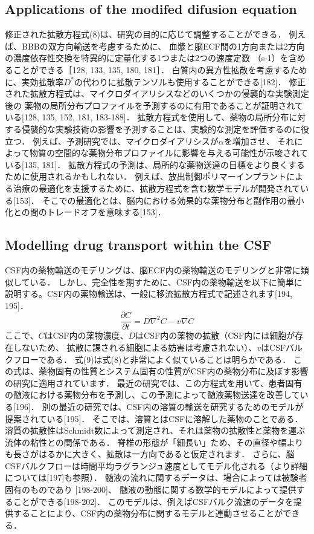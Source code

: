 \documentclass[11pt,a4paper]{jsarticle}
\begin{document}
\subsection{Applications of the modifed difusion equation}
修正された拡散方程式(8)は、研究の目的に応じて調整することができる．
例えば、BBBの双方向輸送を考慮するために、
血漿と脳ECF間の1方向または2方向の濃度依存性交換を特異的に定量化する1つまたは2つの速度定数
（s-1）を含めることができる［128, 133, 135, 180, 181］．
白質内の異方性拡散を考慮するために、実効拡散率$D^{\ast}$の代わりに拡散テンソルも使用することができる[182]．
修正された拡散方程式は、マイクロダイアリシスなどのいくつかの侵襲的な実験測定後の
薬物の局所分布プロファイルを予測するのに有用であることが証明されている[128, 135, 152, 181, 183-188]．
拡散方程式を使用して、薬物の局所分布に対する侵襲的な実験技術の影響を予測することは、実験的な測定を評価するのに役立つ．
例えば、予測研究では、マイクロダイアリシスが$\alpha$を増加させ、
それによって物質の空間的な薬物分布プロファイルに影響を与える可能性が示唆されている[135, 181]．
拡散方程式の予測は、局所的な薬物送達の目標をより良くするために使用されるかもしれない．
例えば、放出制御ポリマーインプラントによる治療の最適化を支援するために、拡散方程式を含む数学モデルが開発されている[153]．
そこでの最適化とは、脳内における効果的な薬物分布と副作用の最小化との間のトレードオフを意味する[153]．
\subsection{Modelling drug transport within the CSF}
CSF内の薬物輸送のモデリングは、脳ECF内の薬物輸送のモデリングと非常に類似している．
しかし、完全性を期すために、CSF内の薬物輸送を以下に簡単に説明する。CSF内の薬物輸送は、一般に移流拡散方程式で記述されます[194, 195]．
\begin{equation}
    \frac{\partial{C}}{\partial{t}}=D\nabla^2 C-v\nabla C
\end{equation}
ここで、$C$はCSF内の薬物濃度、$D$はCSF内の薬物の拡散（CSF内には細胞が存在しないため、
拡散に課される細胞による妨害は考慮されない）、$v$はCSFバルクフローである．
式(9)は式(8)と非常によく似ていることは明らかである．
この式は、薬物固有の性質とシステム固有の性質がCSF内の薬物分布に及ぼす影響の研究に適用されています．
最近の研究では、この方程式を用いて、患者固有の髄液における薬物分布を予測し、この予測によって髄液薬物送達を改善している[196]．
別の最近の研究では、CSF内の溶質の輸送を研究するためのモデルが提案されている[195]．
そこでは、溶質とはCSFに溶解した薬物のことである．
溶質の拡散性はSchmidt数によって測定され、それは薬物の拡散性と薬物を運ぶ流体の粘性との関係である．
脊椎の形態が「細長い」ため、その直径や幅よりも長さがはるかに大きく、拡散は一方向であると仮定されます．
さらに、脳CSFバルクフローは時間平均ラグランジュ速度としてモデル化される（より詳細については[197]も参照）．
髄液の流れに関するデータは、場合によっては被験者固有のものであり [198-200]、
髄液の動態に関する数学的モデルによって提供することができる[198-202]．
このモデルは、例えばCSFバルク流速のデータを提供することにより、CSF内の薬物分布に関するモデルと連動させることができる．
\end{document}
